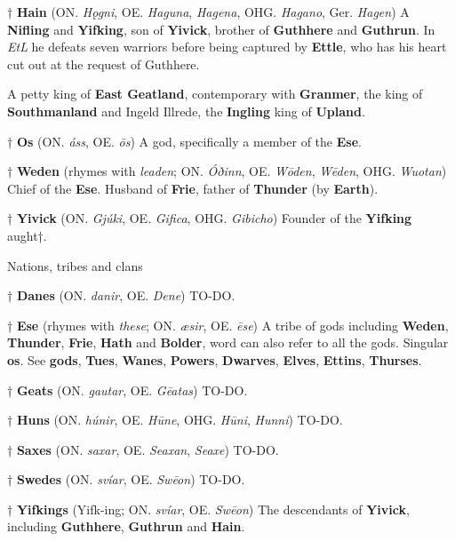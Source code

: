 † \textbf{Hain} (ON. \emph{Hǫgni}, OE. \emph{Haguna}, \emph{Hagena}, OHG. \emph{Hagano}, Ger. \emph{Hagen})
 A \textbf{Nifling} and \textbf{Yifking}, son of \textbf{Yivick}, brother of \textbf{Guthhere} and \textbf{Guthrun}. In \emph{EtL} he defeats seven warriors before being captured by \textbf{Ettle}, who has his heart cut out at the request of Guthhere.
 
 A petty king of \textbf{East Geatland}, contemporary with \textbf{Granmer}, the king of \textbf{Southmanland} and Ingeld Illrede, the \textbf{Ingling} king of \textbf{Upland}.

† \textbf{Os} (ON. \emph{áss}, OE. \emph{ōs})
 A god, specifically a member of the \textbf{Ese}.
 
† \textbf{Weden} (rhymes with \emph{leaden}; ON. \emph{Óðinn}, OE. \emph{Wōden}, \emph{Wēden}, OHG. \emph{Wuotan})
 Chief of the \textbf{Ese}. Husband of \textbf{Frie}, father of \textbf{Thunder} (by \textbf{Earth}).

† \textbf{Yivick} (ON. \emph{Gjúki}, OE. \emph{Gifica}, OHG. \emph{Gibicho})
 Founder of the \textbf{Yifking} aught†.

Nations, tribes and clans

† \textbf{Danes} (ON. \emph{danir}, OE. \emph{Dene})
 TO-DO.

† \textbf{Ese} (rhymes with \emph{these}; ON. \emph{æsir}, OE. \emph{ēse})
 A tribe of gods including \textbf{Weden}, \textbf{Thunder}, \textbf{Frie}, \textbf{Hath} and \textbf{Bolder}, word can also refer to all the gods. Singular \textbf{os}. See \textbf{gods}, \textbf{Tues}, \textbf{Wanes}, \textbf{Powers}, \textbf{Dwarves}, \textbf{Elves}, \textbf{Ettins}, \textbf{Thurses}.
 
† \textbf{Geats} (ON. \emph{gautar}, OE. \emph{Gēatas})
 TO-DO.

† \textbf{Huns} (ON. \emph{húnir}, OE. \emph{Hūne}, OHG. \emph{Hūni}, \emph{Hunni})
 TO-DO.
 
† \textbf{Saxes} (ON. \emph{saxar}, OE. \emph{Seaxan}, \emph{Seaxe})
 TO-DO.

† \textbf{Swedes} (ON. \emph{svíar}, OE. \emph{Swēon})
 TO-DO.
 
† \textbf{Yifkings} (Yifk-ing; ON. \emph{svíar}, OE. \emph{Swēon})
 The descendants of \textbf{Yivick}, including \textbf{Guthhere}, \textbf{Guthrun} and \textbf{Hain}.
